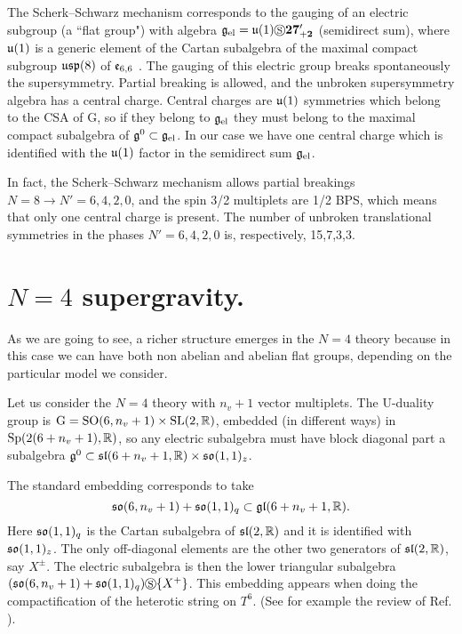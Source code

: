 \documentclass[a4paper,12pt]{article}
\begin{document}
The Scherk--Schwarz \cite{ss,css} mechanism corresponds to the
gauging of an electric subgroup (a ``flat group") with algebra
$\mathfrak{g}_{\mathrm{el}}=\mathfrak{u}(1)\circledS\mathbf{27'_{+2}}$ (semidirect
sum), where
 $\mathfrak{u}(1)$ is a generic element of the Cartan
subalgebra of the maximal compact subgroup $\mathfrak{usp}(8)$ of
$\mathfrak{e}_{6,6}$ \cite{adfl2}. The gauging of this electric group
breaks spontaneously the supersymmetry. Partial breaking is
allowed, and the unbroken supersymmetry algebra has a central
charge.  Central charges are $\mathfrak{u}(1)$ symmetries which belong to
the CSA of G, so if they belong to $\mathfrak{g}_{\mathrm{el}}$ they must
belong to  the maximal compact subalgebra of $\mathfrak{g}^0\subset
\mathfrak{g}_{\mathrm{el}}$. In our case we have one central charge which
is identified with the $\mathfrak{u}(1)$ factor in the semidirect sum
$\mathfrak{g}_{\mathrm{el}}$.

In fact, the Scherk--Schwarz mechanism allows partial breakings
$N=8\rightarrow N'=6,4,2,0$, and the spin 3/2 multiplets are 1/2
BPS, which means that only one central charge is present. The
number of unbroken translational symmetries in the phases
$N'=6,4,2,0$ is, respectively, 15,7,3,3.


\section{$N=4$ supergravity. \label{N=4}}

 As we are going to see, a richer structure emerges in the $N=4$ theory
 because in this case
we can have both non abelian and abelian flat groups, depending on
the particular model we consider.

Let us consider the $N=4$ theory with $n_v+1$ vector multiplets.
The U-duality group is $\mathrm{G}=\mathrm{SO}(6,n_v+1)\times\mathrm{SL}(2,\mathbb{R})$,
embedded  (in different ways) in  $\mathrm{Sp}(2(6+n_v+1),\mathbb{R})$, so any
electric subalgebra must have block diagonal part a subalgebra
$\mathfrak{g}^0 \subset \mathfrak{sl}(6+n_v+1,\mathbb{R}) \times \mathfrak{so}(1,1)_z$.


\bigskip


The standard embedding corresponds to take
$$\mathfrak{so}(6,n_v+1)+\mathfrak{so}(1,1)_q\subset \mathfrak{gl}(6+n_v+1,\mathbb{R}).$$
 Here
$\mathfrak{so}(1,1)_q$ is the Cartan subalgebra of $\mathfrak{sl}(2,\mathbb{R})$ and it is
identified with $\mathfrak{so}(1,1)_z$. The only off-diagonal elements are
the other two generators of $\mathfrak{sl}(2,\mathbb{R})$, say $X^\pm$. The
electric subalgebra is then the lower triangular subalgebra
$(\mathfrak{so}(6,n_v+1)+\mathfrak{so}(1,1)_q)\circledS \{X^+\}$. This embedding
appears when doing the  compactification of the heterotic string
on $T^6$. (See for example the review of Ref. \cite{gpr}).
\end{document}
